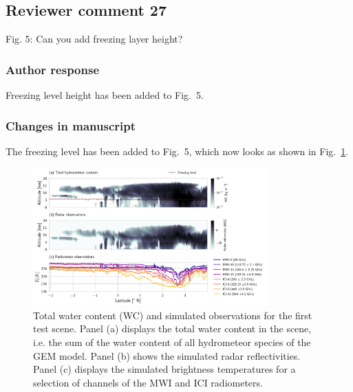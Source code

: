 \subsection*{Reviewer comment 27}
Fig. 5: Can you add freezing layer height?

\subsubsection*{Author response}

Freezing level height has been added to Fig.~5.

\subsubsection*{Changes in manuscript}

The freezing level has been added  to Fig.~5, which
now looks as shown in Fig.~\ref{fig:observations_a}.

\begin{figure}
\centering \includegraphics[width = 0.8\textwidth]{../plots/observations_a}
\caption{Total water content (WC) and simulated observations for the first test
  scene. Panel (a) displays the total water content in the scene, i.e. the sum
  of the water content of all hydrometeor species of the GEM model. Panel (b)
  shows the simulated radar reflectivities. Panel (c) displays the simulated
  brightness temperatures for a selection of channels of the MWI and ICI
  radiometers.}
\label{fig:observations_a}
\end{figure}

%


